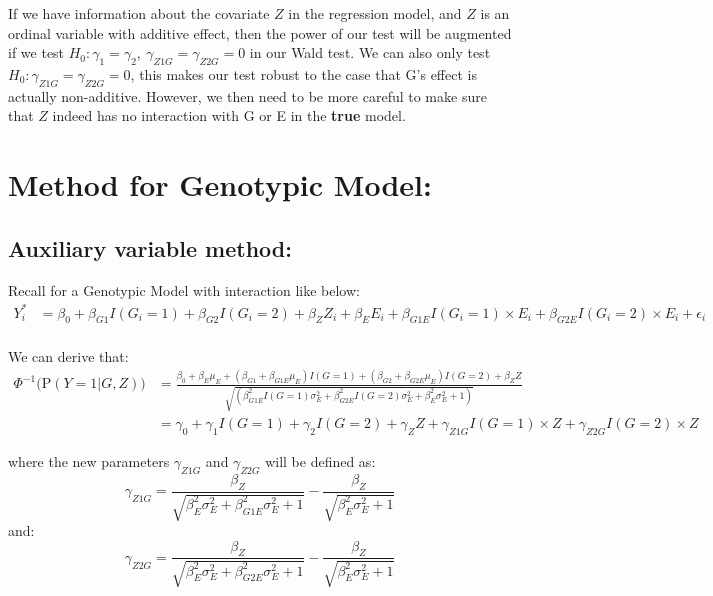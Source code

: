 \documentclass[
]{article}
\begin{document}
If we have information about the covariate \(Z\) in the regression
model, and \(Z\) is an ordinal variable with additive effect, then the
power of our test will be augmented if we test
\(H_0: \gamma_1 = \gamma_2, \ \gamma_{Z1G}=\gamma_{Z2G} =0\) in our Wald
test. We can also only test \(H_0: \gamma_{Z1G}=\gamma_{Z2G} =0\), this
makes our test robust to the case that G's effect is actually
non-additive. However, we then need to be more careful to make sure that
\(Z\) indeed has no interaction with G or E in the \textbf{true} model.

\hypertarget{method-for-genotypic-model}{%
\section{Method for Genotypic Model:}\label{method-for-genotypic-model}}

\hypertarget{auxiliary-variable-method}{%
\subsection{Auxiliary variable
method:}\label{auxiliary-variable-method}}

Recall for a Genotypic Model with interaction like below:
\begin{equation}\label{eqn:genointer}
\begin{aligned}
Y_i^* &= \beta_0 + \beta_{G1} I(G_i = 1) + \beta_{G2} I(G_i = 2) + \beta_Z Z_i + \beta_E E_i + \beta_{G1E} I(G_i = 1) \times E_i + \beta_{G2E} I(G_i = 2) \times E_i  + \epsilon_i \\
\end{aligned}
\end{equation}

We can derive that: \begin{equation}\label{eqn:RStest}
\begin{aligned}
\Phi^{-1} \bigg(\text{P}(Y = 1 | G, Z) \bigg) &= \frac{\beta_0+\beta_E \mu_E+(\beta_{G1} + \beta_{G1E} \mu_E)I(G = 1)+(\beta_{G2} + \beta_{G2E} \mu_E)I(G = 2) + \beta_Z Z}{\sqrt{(\beta_{G1E}^2 I(G = 1) \sigma_E^2 +\beta_{G2E}^2 I(G = 2) \sigma_E^2 + \beta_E^2 \sigma_E^2 + 1)}} \\
&= \gamma_0 + \gamma_1 I(G = 1) + \gamma_2 I(G = 2) + \gamma_Z Z + \gamma_{Z1G} I(G = 1) \times Z + \gamma_{Z2G} I(G = 2) \times Z
\end{aligned}
\end{equation}

where the new parameters \(\gamma_{Z1G}\) and \(\gamma_{Z2G}\) will be
defined as:
\[\gamma_{Z1G} = \frac{\beta_Z}{\sqrt{\beta_E^2\sigma_E^2+\beta_{G1E}^2\sigma_E^2 +1}}-\frac{\beta_Z}{\sqrt{\beta_E^2\sigma_E^2 +1}} \]
and:
\[\gamma_{Z2G} = \frac{\beta_Z}{\sqrt{\beta_E^2\sigma_E^2+\beta_{G2E}^2\sigma_E^2 +1}}-\frac{\beta_Z}{\sqrt{\beta_E^2\sigma_E^2 +1}} \]
\end{document}
